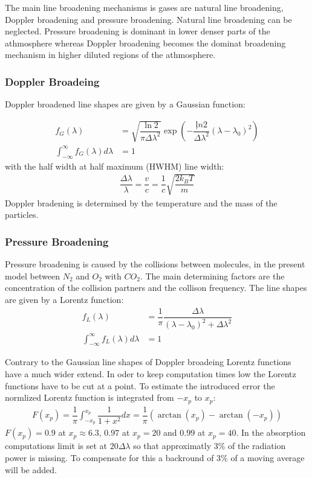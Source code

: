 The main line broadening mechanisms is gases are natural line broadening, Doppler broadening and pressure broadening. Natural line broadening can be neglected. Pressure broadening is dominant in lower denser parts of the athmosphere whereas Doppler broadening becomes the dominat broadening mechanism in higher diluted regions of the athmosphere.

\subsubsection{Doppler Broadeing}

Doppler broadened line shapes are given by a Gaussian function:

\begin{align}
	f_G(\lambda) &= \sqrt{\dfrac{\ln 2}{\pi \Delta \lambda^2}}  
		\exp \left(- \dfrac{ļn 2}{\Delta \lambda^2}  \left(\lambda - \lambda_0\right)^2 \right) \\
			\int_{-\infty}^{\infty}  f_G(\lambda) d\lambda &= 1
\end{align}
with the half width at half maximum (HWHM) line width:
\begin{align}
\dfrac{\Delta \lambda}{\lambda} = \dfrac{v}{c} = \dfrac{1}{c} \sqrt{\dfrac{2 k_B T}{m}}
\end{align}
Doppler bradening is  determined by the temperature and the mass of the particles.

\subsubsection{Pressure Broadening}

Pressure broadening is caused by the collisions between molecules, in the present model between $N_2$ and $O_2$ with $CO_2$. 
The main determining factors are the concentration of the collision partners and the collison frequency. The line shapes are given by a Lorentz function:
\begin{align}
	f_L(\lambda) &= \dfrac{1}{\pi} \dfrac{\Delta \lambda}{ (\lambda - \lambda_0)^2 + \Delta \lambda^2} \\
	\int_{-\infty}^{\infty}  f_L(\lambda) d\lambda &= 1
\end{align}

Contrary to the Gaussian line shapes of Doppler broadeing Lorentz functions have a much wider extend. In oder to keep computation times low the Lorentz functions have to be cut at a point. To estimate the introduced error the normlized Lorentz function is integrated from $-x_p$ to $x_p$:
\begin{align}
	F(x_p) = \dfrac{1}{\pi} \int_{-x_p}^{x_p} \dfrac{1}{1 + x^2} dx = \dfrac{1}{\pi} \left(\arctan(x_p) - \arctan(-x_p)\right)
\end{align}
$F(x_p) = 0.9$ at $x_p \approx 6.3$, $0.97$ at $x_p = 20$ and $0.99$ at $x_p = 40$. In the absorption computations limit is set at  $20 \Delta \lambda$ so that approximatly 3\% of the radiation power is missing. To compensate for this a backround of 3\% of a moving average will be added.


